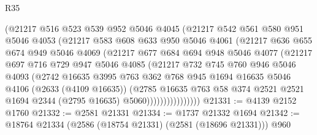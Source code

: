 \begin{lexlean}{R35}
\begin{coremodule}
                  (@21217
                    @516
                    @523
                    @539
                    @952
                    @5046
                    @4045
                    (@21217
                      @542
                      @561
                      @580
                      @951
                      @5046
                      @4053
                      (@21217
                        @583
                        @608
                        @633
                        @950
                        @5046
                        @4061
                        (@21217
                          @636
                          @655
                          @674
                          @949
                          @5046
                          @4069
                          (@21217
                            @677
                            @684
                            @694
                            @948
                            @5046
                            @4077
                            (@21217
                              @697
                              @716
                              @729
                              @947
                              @5046
                              @4085
                              (@21217
                                @732
                                @745
                                @760
                                @946
                                @5046
                                @4093
                                (@2742
                                  @16635
                                  @3995
                                  @763
                                  @362
                                  @768
                                  @945
                                  @1694
                                  @16635
                                  @5046
                                  @4106
                                  (@2633 (@4109 @16635))
                                  (@2785
                                    @16635
                                    @763
                                    @58
                                    @374
                                    @2521
                                    @2521
                                    @1694
                                    @2344
                                    (@2795 @16635)
                                    @5060))))))))))))))))
@21331 := @4139 @2152 @1760
@21332 := @2581 @21331
@21334 := @1737 @21332 @1694
@21342 := @18764 @21334 (@2586 (@18754 @21331) (@2581 (@18696 @21331))) @960

\end{coremodule}
\end{lexlean}
